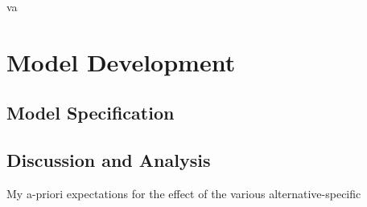va\section{Model Development}
\subsection{Model Specification}
\subsection{Discussion and Analysis}
My a-priori expectations for the effect of the various alternative-specific
